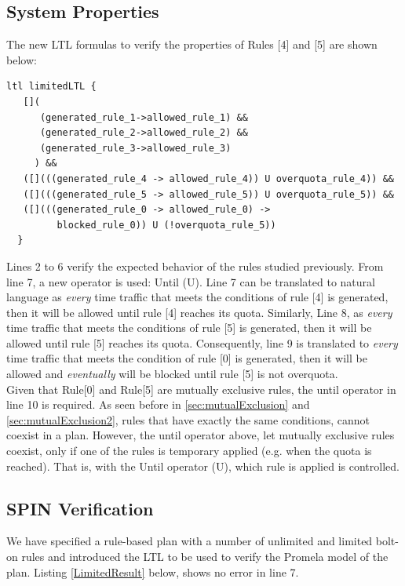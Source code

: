 \subsection{System Properties}
\noindent The new LTL formulas to verify the properties of Rules [4] and [5] are shown below: 

\singlespacing
\begin{lstlisting}[caption=Limited Bolt-on Rules LTL,
  label=limitedLTL]
  ltl limitedLTL {
   []( 
      (generated_rule_1->allowed_rule_1) &&
      (generated_rule_2->allowed_rule_2) &&
      (generated_rule_3->allowed_rule_3)
     ) &&
   ([](((generated_rule_4 -> allowed_rule_4)) U overquota_rule_4)) &&
   ([](((generated_rule_5 -> allowed_rule_5)) U overquota_rule_5)) &&
   ([](((generated_rule_0 -> allowed_rule_0) -> 
         blocked_rule_0)) U (!overquota_rule_5))
  }
\end{lstlisting}
\doublespacing

Lines 2 to 6 verify the expected behavior of the rules studied previously. From line 7, a new operator is used: Until (U). Line 7 can be translated to natural language as \emph{every} time traffic that meets the conditions of rule [4] is generated, then it will be allowed until rule [4] reaches its quota. Similarly, Line 8, as \emph{every} time traffic that meets the conditions of rule [5] is generated, then it will be allowed until rule [5] reaches its quota. Consequently, line 9 is translated to \emph{every} time traffic that meets the condition of rule [0] is generated, then it will be allowed and \emph{eventually} will be blocked until rule [5] is not overquota. \\

Given that Rule[0] and Rule[5] are mutually exclusive rules, the until operator in line 10 is required. As seen before in \ref{sec:mutualExclusion} and \ref{sec:mutualExclusion2}, rules that have exactly the same conditions, cannot coexist in a plan. However, the until operator above, let mutually exclusive rules coexist, only if one of the rules is temporary applied (e.g. when the quota is reached). That is, with the Until operator (U), which rule is applied is controlled. \\

\subsection{SPIN Verification}
\noindent 
We have specified a rule-based plan with a number of unlimited and limited bolt-on rules and introduced the LTL to be used to verify the Promela model of the plan.  Listing \ref{LimitedResult} below, shows no error in line 7. \\

